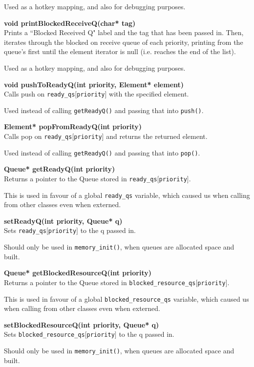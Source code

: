 \documentclass[11pt, oneside]{article}
\begin{document}
Used as a hotkey mapping, and also for debugging purposes.

{\bf void printBlockedReceiveQ(char* tag)}\\
Prints a ``Blocked Received Q" label and the tag that has been passed in. Then, iterates through the blocked on receive queue of each priority, printing from the queue's first until the element iterator is null (i.e. reaches the end of the list).

Used as a hotkey mapping, and also for debugging purposes.

{\bf void pushToReadyQ(int priority, Element* element)}\\
Calls push on {\tt ready\_qs$[$priority$]$} with the specified element.

Used instead of calling {\tt getReadyQ()} and passing that into {\tt push()}.

{\bf Element* popFromReadyQ(int priority)}\\
Calls pop on {\tt ready\_qs$[$priority$]$} and returns the returned element.

Used instead of calling {\tt getReadyQ()} and passing that into {\tt pop()}.

{\bf Queue* getReadyQ(int priority)}\\
Returns a pointer to the Queue stored in {\tt ready\_qs$[$priority$]$}.

This is used in favour of a global {\tt ready\_qs} variable, which caused us when calling from other classes even when externed.

{\bf setReadyQ(int priority, Queue* q)}\\
Sets {\tt ready\_qs$[$priority$]$} to the q passed in.

Should only be used in {\tt memory\_init()}, when queues are allocated space and built.

{\bf Queue* getBlockedResourceQ(int priority)}\\
Returns a pointer to the Queue stored in {\tt blocked\_resource\_qs$[$priority$]$}.

This is used in favour of a global {\tt blocked\_resource\_qs} variable, which caused us when calling from other classes even when externed.

{\bf setBlockedResourceQ(int priority, Queue* q)}\\
Sets {\tt blocked\_resource\_qs$[$priority$]$} to the q passed in.

Should only be used in {\tt memory\_init()}, when queues are allocated space and built.
\end{document}
